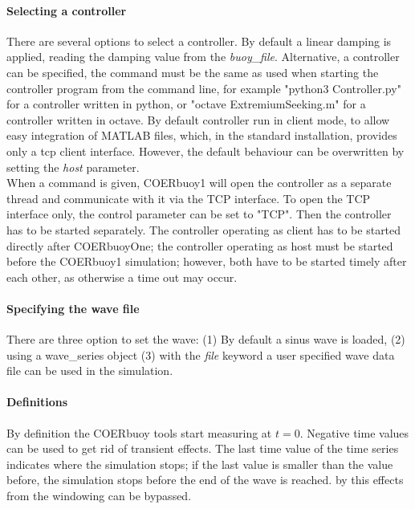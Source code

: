 \documentclass[oneside,10pt,a4paper]{book}
\begin{document}
\paragraph{Selecting a controller}
There are several options to select a controller. By default a linear damping is applied, reading the damping value from the \textit{buoy\_file}. Alternative, a controller can be specified, the command must be the same as used when starting the controller program from the command line, for example "python3 Controller.py" for a controller written in python, or "octave ExtremiumSeeking.m" for a controller written in octave. By default controller run in client mode, to allow easy integration of MATLAB files, which, in the standard installation, provides only a tcp client interface. However, the default behaviour can be overwritten by setting the \textit{host} parameter.\\
When a command is given, COERbuoy1 will open the controller as a separate thread and communicate with it via the TCP interface. To open the TCP interface only, the control parameter can be set to "TCP". Then the controller has to be started separately. The controller operating as client has to be started directly after COERbuoyOne; the controller operating as host must be started before the COERbuoy1 simulation; however, both have to be started timely after each other, as otherwise a time out may occur.
\paragraph{Specifying the wave file}
There are three option to set the wave: (1) By default a sinus wave is loaded, (2) using a wave\_series object (3) with the \textit{file} keyword a user specified wave data file can be used in the simulation.
\paragraph{Definitions}
By definition the COERbuoy tools start measuring at $t=0$. Negative time values can be used to get rid of transient effects. The last time value of the time series indicates where the simulation stops; if the last value is smaller than the value before, the simulation stops before the end of the wave is reached. by this effects from the windowing can be bypassed.
\end{document}
